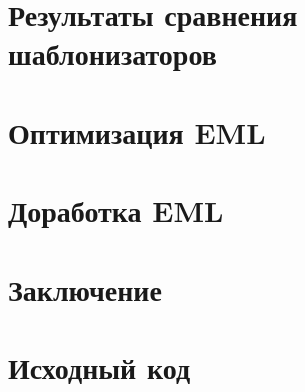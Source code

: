 \newpage
\section{Результаты сравнения шаблонизаторов}


\newpage
\section{Оптимизация EML}


\newpage
\section{Доработка EML}


\newpage
\section*{Заключение}





\appendix
\section*{Исходный код}


